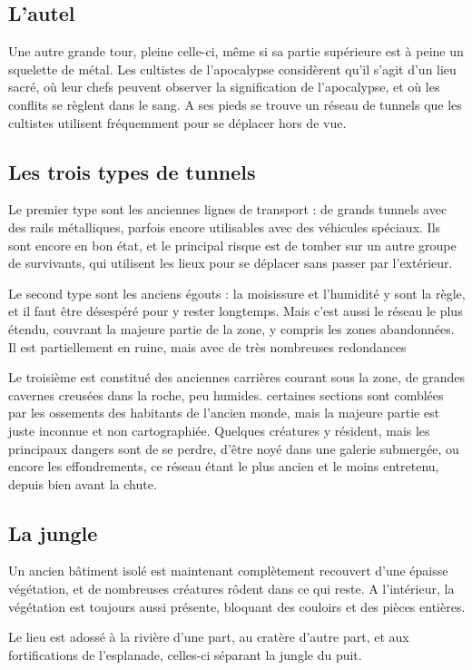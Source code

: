 \documentclass[10pt,a4paper]{article}
\begin{document}
\subsection{L'autel}
Une autre grande tour, pleine celle-ci, même si sa partie supérieure est à peine un squelette de métal. Les cultistes de l'apocalypse considèrent qu'il s'agit d'un lieu sacré, où leur chefs peuvent observer la signification de l'apocalypse, et où les conflits se règlent dans le sang.
A ses pieds se trouve un réseau de tunnels que les cultistes utilisent fréquemment pour se déplacer hors de vue.

\subsection{Les trois types de tunnels}
Le premier type sont les anciennes lignes de transport : de grands tunnels avec des rails métalliques, parfois encore utilisables avec des véhicules spéciaux. Ils sont encore en bon état, et le principal risque est de tomber sur un autre groupe de survivants, qui utilisent les lieux pour se déplacer sans passer par l'extérieur.

Le second type sont les anciens égouts : la moisissure et l'humidité y sont la règle, et il faut être désespéré pour y rester longtemps. Mais c'est aussi le réseau le plus étendu, couvrant la majeure partie de la zone, y compris les zones abandonnées. Il est partiellement en ruine, mais avec de très nombreuses redondances

Le troisième est constitué des anciennes carrières courant sous la zone, de grandes cavernes creusées dans la roche, peu humides. certaines sections sont comblées par les ossements des habitants de l'ancien monde, mais la majeure partie est juste inconnue et non cartographiée. Quelques créatures y résident, mais les principaux dangers sont de se perdre, d'être noyé dans une galerie submergée, ou encore les effondrements, ce réseau étant le plus ancien et le moins entretenu, depuis bien avant la chute.
\subsection{La jungle}
Un ancien bâtiment isolé est maintenant complètement recouvert d'une épaisse végétation, et de nombreuses créatures rôdent dans ce qui reste. A l'intérieur, la végétation est toujours aussi présente, bloquant des couloirs et des pièces entières.

Le lieu est adossé à la rivière d'une part, au cratère d'autre part, et aux fortifications de l'esplanade, celles-ci séparant la jungle du puit.
\end{document}
